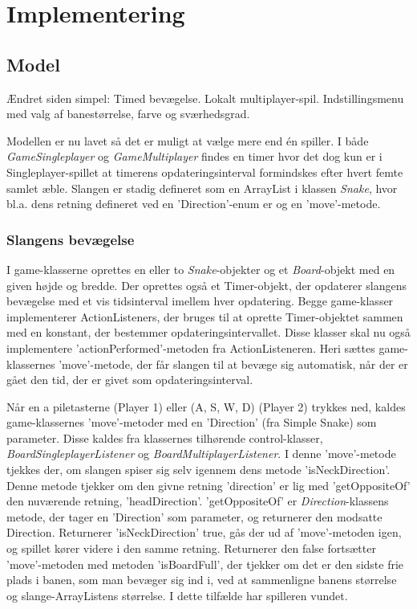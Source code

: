 \section{Implementering}
\subsection{Model}
Ændret siden simpel: Timed bevægelse. Lokalt multiplayer-spil. Indstillingsmenu med valg af banestørrelse, farve og sværhedsgrad.
\newline

Modellen er nu lavet så det er muligt at vælge mere end én spiller. I både \textit{GameSingleplayer} og \textit{GameMultiplayer} findes en timer hvor det dog kun er i Singleplayer-spillet at timerens opdateringsinterval formindskes efter hvert femte samlet æble. Slangen er stadig defineret som en ArrayList i klassen \textit{Snake}, hvor bl.a. dens retning defineret ved en 'Direction'-enum er og en 'move'-metode.
\newline

\subsubsection{Slangens bevægelse}
I game-klasserne oprettes en eller to \textit{Snake}-objekter og et \textit{Board}-objekt med en given højde og bredde. Der oprettes også et Timer-objekt, der opdaterer slangens bevægelse med et vis tidsinterval imellem hver opdatering. Begge game-klasser implementerer ActionListeners, der bruges til at oprette Timer-objektet sammen med en konstant, der bestemmer opdateringsintervallet. Disse klasser skal nu også implementere 'actionPerformed'-metoden fra ActionListeneren. Heri sættes game-klassernes 'move'-metode, der får slangen til at bevæge sig automatisk, når der er gået den tid, der er givet som opdateringsinterval.
\newline

Når en a piletasterne (Player 1) eller (A, S, W, D) (Player 2) trykkes ned, kaldes game-klassernes 'move'-metoder med en 'Direction' (fra Simple Snake) som parameter. Disse kaldes fra klassernes tilhørende control-klasser, \textit{BoardSingleplayerListener} og \textit{BoardMultiplayerListener}. I denne 'move'-metode tjekkes der, om slangen spiser sig selv igennem dens metode 'isNeckDirection'. Denne metode tjekker om den givne retning 'direction' er lig med 'getOppositeOf' den nuværende retning, 'headDirection'. 'getOppositeOf' er \textit{Direction}-klassens metode, der tager en 'Direction' som parameter, og returnerer den modsatte Direction. Returnerer 'isNeckDirection' true, gås der ud af 'move'-metoden igen, og spillet kører videre i den samme retning. Returnerer den false fortsætter 'move'-metoden med metoden 'isBoardFull', der tjekker om det er den sidste frie plads i banen, som man bevæger sig ind i, ved at sammenligne banens størrelse og slange-ArrayListens størrelse. I dette tilfælde har spilleren vundet.
\newline

